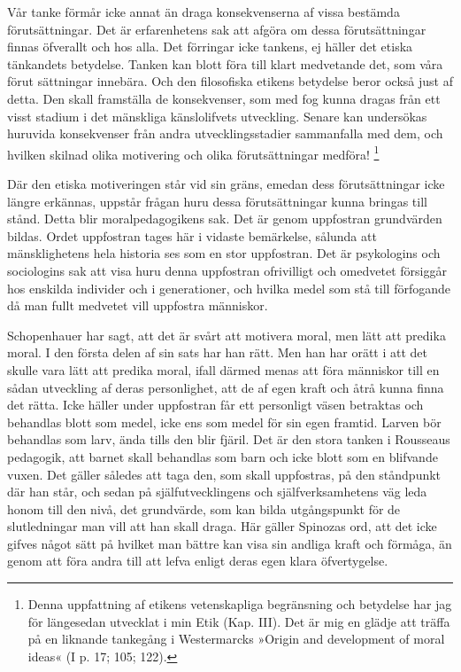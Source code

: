 \documentclass[12pt]{article}
\newcommand{\opage}[1]{\marginnote{\footnotesize\textit{[#1]}}}
\begin{document}
Vår tanke förmår icke annat än draga konsekvenserna af vissa bestämda förutsättningar. Det är erfarenhetens sak att afgöra om dessa förutsättningar finnas öfverallt och hos alla. Det förringar icke tankens, ej häller det etiska tänkandets betydelse. Tanken kan blott föra till klart medvetande det, som våra förut%
\opage{54}
sättningar innebära. Och den filosofiska etikens betydelse beror också just af detta. Den skall framställa de konsekvenser, som med fog kunna dragas från ett visst stadium i det mänskliga känslolifvets utveckling. Senare kan undersökas huruvida konsekvenser från andra utvecklingsstadier sammanfalla med dem, och hvilken skilnad olika motivering och olika förutsättningar medföra!%
\footnote[1]{Denna uppfattning af etikens vetenskapliga begränsning och betydelse har jag för längesedan utvecklat i min Etik (Kap. III). Det är mig en glädje att träffa på en liknande tankegång i Westermarcks »Origin and development of moral ideas« (I p. 17; 105; 122).}

Där den etiska motiveringen står vid sin gräns, emedan dess förutsättningar icke längre erkännas, uppstår frågan huru dessa förutsättningar kunna bringas till stånd. Detta blir moralpedagogikens sak. Det är genom uppfostran grundvärden bildas. Ordet uppfostran tages här i vidaste bemärkelse, sålunda att mänsklighetens hela historia ses som en stor uppfostran. Det är psykologins och sociologins sak att visa huru denna uppfostran ofrivilligt och omedvetet försiggår hos enskilda individer och i generationer, och %
\opage{55}
hvilka medel som stå till förfogande då man fullt medvetet vill uppfostra människor.

Schopenhauer har sagt, att det är svårt att motivera moral, men lätt att predika moral. I den första delen af sin sats har han rätt. Men han har orätt i att det skulle vara lätt att predika moral, ifall därmed menas att föra människor till en sådan utveckling af deras personlighet, att de af egen kraft och åtrå kunna finna det rätta. Icke häller under uppfostran får ett personligt väsen betraktas och behandlas blott som medel, icke ens som medel för sin egen framtid. Larven bör behandlas som larv, ända tills den blir fjäril. Det är den stora tanken i Rousseaus pedagogik, att barnet skall behandlas som barn och icke blott som en blifvande vuxen. Det gäller således att taga den, som skall uppfostras, på den ståndpunkt där han står, och sedan på själfutvecklingens och själfverksamhetens väg leda honom till den nivå, det grundvärde, som kan bilda utgångspunkt för de slutledningar man vill att han skall draga. Här gäller Spinozas ord, att det icke gifves något sätt på hvilket man bättre kan visa sin andliga kraft och förmåga, än genom att föra andra %
\opage{56}
till att lefva enligt deras egen klara öfvertygelse.
\end{document}

